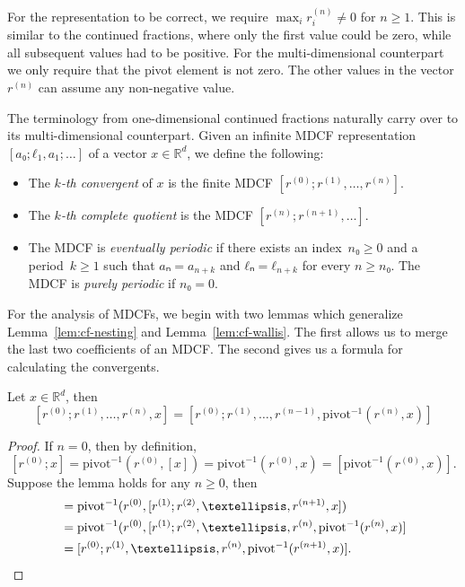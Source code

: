 For the representation to be correct, we require $\max_i r_i^{(n)} ≠ 0$ for $n ≥ 1$.
This is similar to the continued fractions, where only the first value could be zero,
while all subsequent values had to be positive.
For the multi-dimensional counterpart we only require that the pivot element is not zero.
The other values in the vector $r^{(n)}$ can assume any non-negative value.

The terminology from one-dimensional continued fractions naturally carry over to its
multi-dimensional counterpart.
Given an infinite MDCF representation~$[a₀; ℓ_1, a_1; …]$ of a vector $x ∈ ℝ^d$, we define the following:

\begin{itemize}
  \item The \emph{$k$-th convergent} of $x$ is the finite MDCF $[r^{(0)}; r^{(1)}, …, r^{(n)}]$.
  \item The \emph{$k$-th complete quotient} is the MDCF $[r^{(n)}; r^{(n+1)}, …]$.
  \item The MDCF is \emph{eventually periodic} if there exists an index~$n₀ ≥ 0$
    and a period~$k ≥ 1$ such that $aₙ = a_{n+k}$ and $ℓₙ = ℓ_{n+k}$
    for every $n ≥ n₀$.
    The MDCF is \emph{purely periodic} if $n₀ = 0$.
\end{itemize}

For the analysis of MDCFs,
we begin with two lemmas which generalize Lemma~\ref{lem:cf-nesting} and
Lemma~\vref{lem:cf-wallis}.
The first allows us to merge the last two coefficients of an MDCF.
The second gives us a formula for calculating the convergents.

\begin{lemma}
  \label{lem:mdcf-nesting}
  Let $x ∈ ℝ^d$, then
  \[
    [r^{(0)}; r^{(1)}, …, r^{(n)}, x]
    = [r^{(0)}; r^{(1)}, …, r^{(n-1)}, \mathrm{pivot}^{-1}(r^{(n)}, x)]
  \]
\end{lemma}

\begin{proof}
  If $n = 0$, then by definition,
  \[
    [r^{(0)}; x] = \mathrm{pivot}^{-1}(r^{(0)}, [x]) = \mathrm{pivot}^{-1}(r^{(0)}, x) = [\mathrm{pivot}^{-1}(r^{(0)}, x)].
  \]
  Suppose the lemma holds for any $n ≥ 0$, then
  \begin{align*}
    [r^{(0)}; r^{(1)}, …, r^{(n+1)}, x]
    & = \mathrm{pivot}^{-1}(r^{(0)}, [r^{(1)}; r^{(2)}, …, r^{(n+1)}, x]) \\
    & = \mathrm{pivot}^{-1}(r^{(0)}, [r^{(1)}; r^{(2)}, …, r^{(n)}, \mathrm{pivot}^{-1}(r^{(n)}, x)] \\
    & = [r^{(0)}; r^{(1)}, …, r^{(n)}, \mathrm{pivot}^{-1}(r^{(n+1)}, x)]. \qedhere
  \end{align*}
\end{proof}

